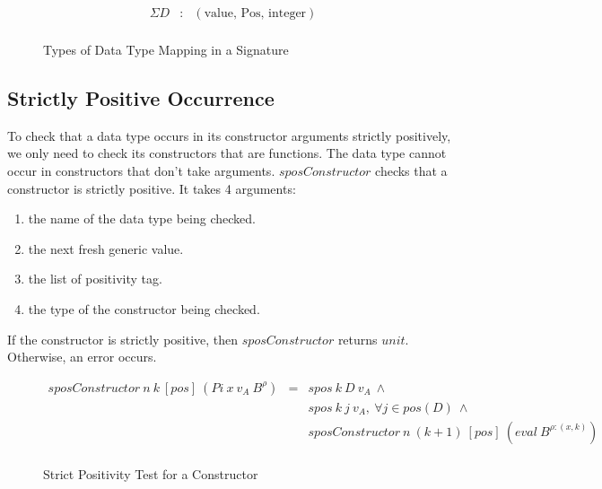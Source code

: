 \begin{figure}[H]
  \begin{equation*}
    \begin{aligned}
      \Sigma D & : & (\textrm{value, Pos, integer}) \\
    \end{aligned}
  \end{equation*}
  \caption{Types of Data Type Mapping in a Signature}
\end{figure}

\subsection{Strictly Positive Occurrence}

To check that a data type occurs in its constructor arguments strictly positively, we only need to check its constructors that are functions. The data type cannot occur in constructors that don't take arguments. $sposConstructor$ checks that a constructor is strictly positive. It takes 4 arguments:

\begin{enumerate}
  \item the name of the data type being checked.
  \item the next fresh generic value.
  \item the list of positivity tag.
  \item the type of the constructor being checked.
\end{enumerate}

If the constructor is strictly positive, then $sposConstructor$ returns $unit$. Otherwise, an error occurs.

\begin{figure}[H]
  \begin{equation*}
    \begin{aligned}
      sposConstructor \: n \: k \: [pos] \: (Pi \: x \: v_A \: B^{\rho}) & = & spos \: k \: D \: v_A \: \land                                     \\
                                                                         &   & spos \: k \: j \: v_A, \: \forall j \in pos(D) \: \land            \\
                                                                         &   & sposConstructor \: n \: (k+1) \: [pos] \: (eval \: B^{\rho:(x,k)}) \\
    \end{aligned}
  \end{equation*}
  \caption{Strict Positivity Test for a Constructor}
\end{figure}

